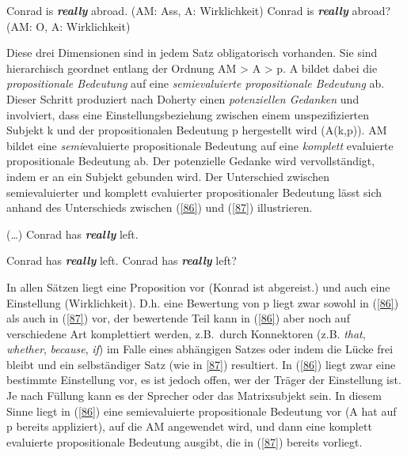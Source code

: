 \begin{exe}
	\ex\label{85} 
		\begin{xlist}	
			\ex\label{85a} Conrad is \textbf{\textit{really}} abroad. (AM: Ass, A: Wirklichkeit)
			\ex\label{85b} Conrad is \textbf{\textit{really}} abroad? (AM: O, A: Wirklichkeit)
			\hfill\hbox{\citet[14]{Doherty1987}}
		\end{xlist}
\end{exe}				           
Diese drei Dimensionen sind in jedem Satz obligatorisch vorhanden. Sie sind hie\-rarchisch geordnet entlang der Ordnung AM > A > p. A bildet dabei die \textit{propositionale Bedeutung} auf eine \textit{semievaluier\-te propositionale Bedeutung} ab. Dieser Schritt produziert nach Doherty einen \textit{potenziellen Gedanken} und involviert, dass eine Einstellungsbeziehung zwischen einem unspezifizierten Subjekt k und der propositionalen Bedeutung p hergestellt wird (A(k,p)). AM bildet eine \emph{semi}evalu\-ierte propositionale Bedeutung auf eine \emph{komplett} evaluierte propositionale Bedeutung ab. Der potenzielle Gedanke wird vervollständigt, indem er an ein Subjekt gebunden wird. Der Unterschied zwischen semievaluierter und komplett evaluierter propositionaler Bedeutung lässt sich anhand des Unterschieds zwischen (\ref{86}) und (\ref{87}) illustrieren.

\begin{exe}
	\ex\label{86} 
		(\ldots) Conrad has \textbf{\textit{really}} left.
\end{exe}
\begin{exe}
	\ex\label{87} 
		\begin{xlist}	
			\ex\label{87a} Conrad has \textbf{\textit{really}} left.
			\ex\label{87b} Conrad has \textbf{\textit{really}} left?
		\end{xlist}
\end{exe}
In allen Sätzen liegt eine Proposition vor (Konrad ist abgereist.) und auch eine Einstellung (Wirklichkeit). D.h. eine Bewertung von p liegt zwar sowohl in (\ref{86}) als auch in (\ref{87}) vor, der bewertende Teil kann in (\ref{86}) aber noch auf verschiedene Art komplettiert werden, z.B.\ durch Konnektoren (z.B.\textit{ that}, \textit{whether}, \textit{because}, \textit{if}) im Falle eines abhängigen Satzes oder indem die Lücke frei bleibt und ein selbständiger Satz (wie in \ref{87}) resultiert. In (\ref{86}) liegt zwar eine bestimmte Einstellung vor, es ist jedoch offen, wer der Träger der Einstellung ist. Je nach Füllung kann es der Sprecher oder das Matrixsubjekt sein. In diesem Sinne liegt in (\ref{86}) eine semievaluierte propositionale Bedeutung vor (A hat auf p bereits appliziert), auf die AM angewendet wird, und dann eine komplett evaluierte propositionale Bedeutung ausgibt, die in (\ref{87}) bereits vorliegt.

